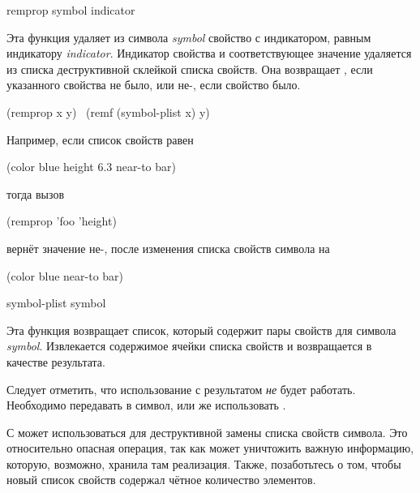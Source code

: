 \begin{defun}[Функция]
remprop symbol indicator

Эта функция удаляет из символа \emph{symbol} свойство с индикатором, равным
 индикатору \emph{indicator}. Индикатор свойства и соответствующее
значение удаляется из списка деструктивной склейкой списка свойств. Она
возвращает {\false}, если указанного свойства не было, или не-{\false}, если
свойство было.
\begin{lisp}
(remprop x y) \EQ\ (remf (symbol-plist x) y)
\end{lisp}
Например, если список свойств  равен
\begin{lisp}
(color blue height 6.3 near-to bar)
\end{lisp}
тогда вызов
\begin{lisp}
(remprop 'foo 'height)
\end{lisp}
вернёт значение не-{\nil}, после изменения списка свойств символа  на
\begin{lisp}
(color blue near-to bar)
\end{lisp}
\end{defun}

\begin{defun}[Функция]
symbol-plist symbol

Эта функция возвращает список, который содержит пары свойств для символа
\emph{symbol}. Извлекается содержимое ячейки списка свойств и возвращается в
качестве результата.

Следует отметить, что использование  с результатом 
\emph{не} будет работать. Необходимо передавать в  символ, или же
использовать .

С  может использоваться  для деструктивной замены
списка свойств символа. Это относительно опасная операция, так как может
уничтожить важную информацию, которую, возможно, хранила там реализация.
Также, позаботьтесь о том, чтобы новый список свойств содержал чётное количество
элементов.
\end{defun}

